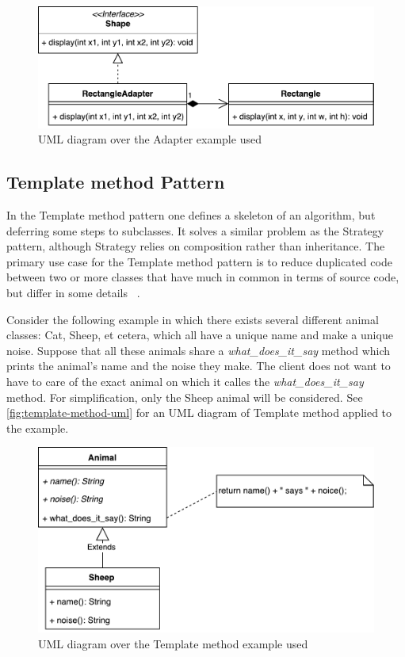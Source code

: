 \documentclass[conference]{IEEEtran}
\begin{document}
\begin{figure}[htpb]
    \centering
    \includegraphics[width=0.8\linewidth]{adapter-ex.pdf}
    \caption{UML diagram over the Adapter example used}
    \label{fig:adapter-uml}
\end{figure}

\subsection{Template method Pattern}
\label{sub:template_method_pattern}
In the Template method pattern one defines a skeleton of an algorithm, but deferring some steps to subclasses.
It solves a similar problem as the Strategy pattern, although Strategy relies on composition rather than inheritance.
The primary use case for the Template method pattern is to reduce duplicated code between two or more classes that have much in common in terms of source code, but differ in some details ~\cite{gamma1993:gof}.

Consider the following example in which there exists several different animal classes: Cat, Sheep, et cetera, which all have a unique name and make a unique noise.
Suppose that all these animals share a \emph{what\_does\_it\_say} method which prints the animal's name and the noise they make.
The client does not want to have to care of the exact animal on which it calles the \emph{what\_does\_it\_say} method.
For simplification, only the Sheep animal will be considered.
See \autoref{fig:template-method-uml} for an UML diagram of Template method applied to the example.

\begin{figure}[htpb]
    \centering
    \includegraphics[width=0.8\linewidth]{template-method-ex.pdf}
    \caption{UML diagram over the Template method example used}
    \label{fig:template-method-uml}
\end{figure}
\end{document}
